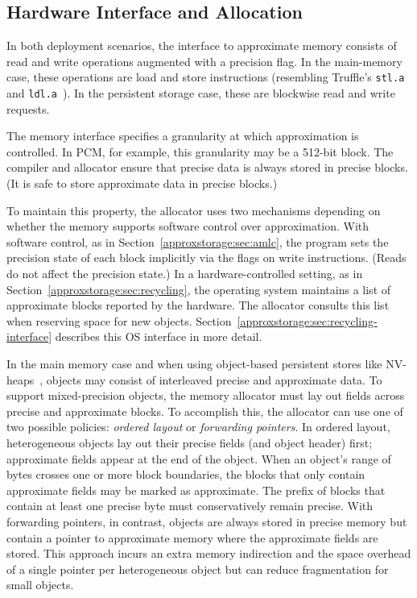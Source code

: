 \subsection{Hardware Interface and Allocation}

In both deployment scenarios, the interface to approximate memory consists of read
and write operations augmented with a precision flag.
In the main-memory case, these operations are load and store instructions
(resembling Truffle's \verb+stl.a+ and \verb+ldl.a+~\cite{truffle}).
In the persistent storage case, these are blockwise read and write requests.

The memory interface specifies a granularity at which approximation is
controlled. In PCM, for example, this granularity may be a 512-bit block. The
compiler and allocator ensure that precise data is always stored in
precise blocks.
(It is safe to store approximate data
in precise blocks.)

To maintain this property, the allocator uses
two mechanisms depending on whether the memory supports software control over
approximation.
With software control, as in Section~\ref{approxstorage:sec:amlc}, the program sets the precision state
of each block implicitly via the flags on write instructions. (Reads do not
affect the precision state.)
In a hardware-controlled setting, as in Section~\ref{approxstorage:sec:recycling}, the operating system maintains a
list of approximate blocks reported by the hardware.
The allocator consults this list when reserving
space for new objects. Section~\ref{approxstorage:sec:recycling-interface} describes this OS
interface in more detail.

In the main memory case and when using object-based persistent stores like
NV-heaps~\cite{nvheaps}, objects may consist of interleaved precise and
approximate data. To support mixed-precision objects, the memory allocator
must lay out fields across precise and approximate blocks.
To accomplish this, the allocator can use one of two possible policies:
\emph{ordered layout} or \emph{forwarding pointers}. In ordered
layout, heterogeneous objects lay out their
precise fields (and object header) first; approximate fields appear at the end
of the object. When an object's range of bytes crosses one or more block
boundaries, the blocks that only contain approximate fields may be marked as
approximate. The prefix of blocks that contain at least one precise byte must
conservatively remain precise. With forwarding pointers, in contrast, objects
are always stored in precise memory but contain a pointer to approximate memory
where the approximate fields are stored. This approach incurs an extra memory
indirection and the space overhead of a single pointer per heterogeneous object but can
reduce fragmentation for small objects.

